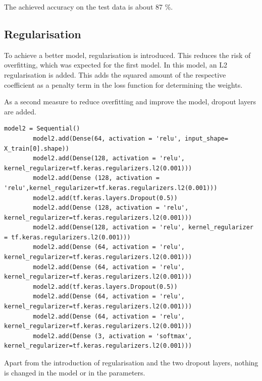 \medskip

The achieved accuracy on the test data is about 87 \%.

\subsection{Regularisation}

To achieve a better model, regularisation is introduced. This reduces the risk of overfitting, which was expected for the first model. In this model, an L2 regularisation is added. This adds the squared amount of the respective coefficient as a penalty term in the loss function for determining the weights.  

As a second measure to reduce overfitting and improve the model, dropout layers are added.

\begin{code}
    \begin{lstlisting}[numbers=none]
        model2 = Sequential()
        model2.add(Dense(64, activation = 'relu', input_shape= X_train[0].shape))
        model2.add(Dense(128, activation = 'relu', kernel_regularizer=tf.keras.regularizers.l2(0.001)))
        model2.add(Dense (128, activation = 'relu',kernel_regularizer=tf.keras.regularizers.l2(0.001)))
        model2.add(tf.keras.layers.Dropout(0.5))
        model2.add(Dense (128, activation = 'relu', kernel_regularizer=tf.keras.regularizers.l2(0.001)))
        model2.add(Dense(128, activation = 'relu', kernel_regularizer = tf.keras.regularizers.l2(0.001)))
        model2.add(Dense (64, activation = 'relu', kernel_regularizer=tf.keras.regularizers.l2(0.001)))
        model2.add(Dense (64, activation = 'relu', kernel_regularizer=tf.keras.regularizers.l2(0.001)))
        model2.add(tf.keras.layers.Dropout(0.5))
        model2.add(Dense (64, activation = 'relu', kernel_regularizer=tf.keras.regularizers.l2(0.001)))
        model2.add(Dense (64, activation = 'relu', kernel_regularizer=tf.keras.regularizers.l2(0.001)))
        model2.add(Dense (3, activation = 'softmax', kernel_regularizer=tf.keras.regularizers.l2(0.001)))
    \end{lstlisting}
    
    \caption{Construction of the neural network for the data set Iris - Improved version}
\end{code}

Apart from the introduction of regularisation and the two dropout layers, nothing is changed in the model or in the parameters. 

